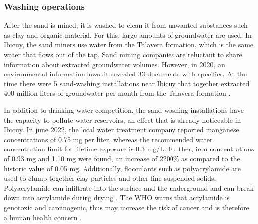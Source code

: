 \subsubsection{Washing operations}
After the sand is mined, it is washed to clean it from unwanted substances such as clay and organic material. For this, large amounts of groundwater are used. In Ibicuy, the sand miners use water from the Talavera formation, which is the same water that flows out of the tap. Sand mining companies are reluctant to share information about extracted groundwater volumes. However, in 2020, an environmental information lawsuit revealed 33 documents with specifics. At the time there were 5 sand-washing installations near Ibicuy that together extracted 400 million liters of groundwater per month from the Talavera formation \autocite{fogliaSedArena2023}.

In addition to drinking water competition, the sand washing installations have the capacity to pollute water reservoirs, an effect that is already noticeable in Ibicuy. In june 2022, the local water treatment company reported manganese concentrations of 0.75 mg per liter, whereas the recommended water concentration limit for lifetime exposure is 0.3 mg/L. Further, iron concentrations of 0.93 mg and 1.10 mg were found, an increase of 2200\% as compared to the historic value of 0.05 mg. Additionally, flocculants such as polyacrylamide are used to clump together clay particles and other fine suspended solids. Polyacrylamide can infiltrate into the surface and the underground and can break down into acrylamide during drying \autocite{fogliaSedArena2023}. The WHO warns that acrylamide is genotoxic and carcinogenic, thus may increase the risk of cancer and is therefore a human health concern \autocite{worldhealthorganizationAcrylamide2011}.